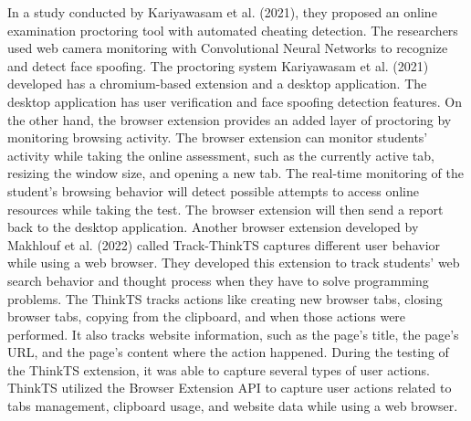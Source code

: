 \documentclass{icsthesis}
\begin{document}
\begin{mainmatter}
\indent In a study conducted by Kariyawasam et al. (2021), they proposed an online examination proctoring tool with automated cheating detection. The researchers used web camera monitoring with Convolutional Neural Networks to recognize and detect face spoofing. The proctoring system Kariyawasam et al. (2021) developed has a chromium-based extension and a desktop application. The desktop application has user verification and face spoofing detection features. On the other hand, the browser extension provides an added layer of proctoring by monitoring browsing activity. The browser extension can monitor students' activity while taking the online assessment, such as the currently active tab, resizing the window size, and opening a new tab. The real-time monitoring of the student's browsing behavior will detect possible attempts to access online resources while taking the test. The browser extension will then send a report back to the desktop application. Another browser extension developed by Makhlouf et al. (2022) called Track-ThinkTS captures different user behavior while using a web browser. They developed this extension to track students' web search behavior and thought process when they have to solve programming problems. The ThinkTS tracks actions like creating new browser tabs, closing browser tabs, copying from the clipboard, and when those actions were performed. It also tracks website information, such as the page's title, the page's URL, and the page's content where the action happened. During the testing of the ThinkTS extension, it was able to capture several types of user actions. ThinkTS utilized the Browser Extension API to capture user actions related to tabs management, clipboard usage, and website data while using a web browser.\\


\end{mainmatter}
\end{document}
